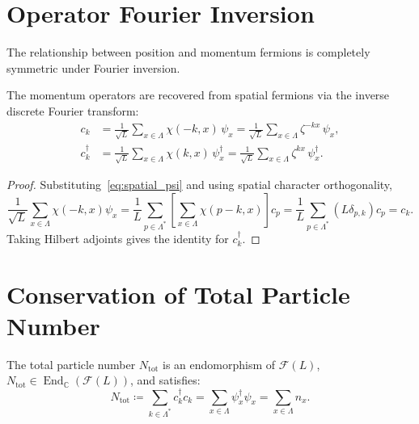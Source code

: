 \section{Operator Fourier Inversion}

The relationship between position and momentum fermions is completely symmetric under Fourier inversion.

\begin{theorem}
\label{thm:op_fourier_inversion}
The momentum operators are recovered from spatial fermions via the inverse discrete Fourier transform:
\begin{align}
c_k &= \frac{1}{\sqrt{L}} \sum_{x \in \Lambda} \chi(-k, x)\, \psi_x = \frac{1}{\sqrt{L}} \sum_{x \in \Lambda} \zeta^{-k x}\, \psi_x, \label{eq:inv_ck} \\
c_k^\dagger &= \frac{1}{\sqrt{L}} \sum_{x \in \Lambda} \chi(k, x)\, \psi_x^\dagger = \frac{1}{\sqrt{L}} \sum_{x \in \Lambda} \zeta^{k x}\, \psi_x^\dagger. \label{eq:inv_ckdag}
\end{align}
\end{theorem}

\begin{proof}
Substituting~\eqref{eq:spatial_psi} and using spatial character orthogonality,
\begin{equation}
\frac1{\sqrt L}\sum_{x\in\Lambda}\chi(-k,x)\psi_x
=\frac1L\sum_{p\in\Lambda^*}\left[\sum_{x\in\Lambda}\chi(p-k,x)\right]c_p
=\frac1L\sum_{p\in\Lambda^*}(L\delta_{p,k})c_p=c_k.
\end{equation}
Taking Hilbert adjoints gives the identity for $c_k^\dagger$.
\end{proof}

\section{Conservation of Total Particle Number}

\begin{theorem}
\label{thm:number_invariance}
The total particle number $N_{\mathrm{tot}}$ is an endomorphism of $\mathcal F(L)$, $N_{\mathrm{tot}}\in\operatorname{End}_{\mathbb C}(\mathcal F(L))$, and satisfies:
\begin{equation}
N_{\mathrm{tot}} \coloneqq \sum_{k \in \Lambda^*} c_k^\dagger c_k = \sum_{x \in \Lambda} \psi_x^\dagger \psi_x = \sum_{x \in \Lambda} n_x.
\end{equation}
\end{theorem}

